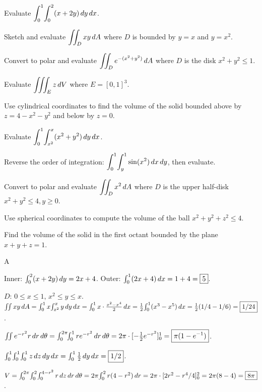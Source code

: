 \documentclass[11pt]{article}
\begin{document}
\begin{problems}
\item Evaluate $\displaystyle \int_0^1 \!\int_0^2 (x + 2y) \,dy \,dx$.
\item Sketch and evaluate $\displaystyle \iint_D x y \,dA$ where $D$ is bounded by $y = x$ and $y = x^2$.
\item Convert to polar and evaluate $\displaystyle \iint_D e^{-(x^2+y^2)} \,dA$ where $D$ is the disk $x^2 + y^2 \le 1$.
\item Evaluate $\displaystyle \iiint_E z \,dV$ where $E = [0,1]^3$.
\item Use cylindrical coordinates to find the volume of the solid bounded above by $z = 4 - x^2 - y^2$ and below by $z = 0$.
\end{problems}

\vfill
\newpage
{}
\begin{problems}
\item Evaluate $\displaystyle \int_0^1 \!\int_{x^2}^{x} (x^2 + y^2) \,dy \,dx$.
\item Reverse the order of integration: $\displaystyle \int_0^1 \!\int_y^1 \sin(x^2) \,dx \,dy$, then evaluate.
\item Convert to polar and evaluate $\displaystyle \iint_D x^2 \,dA$ where $D$ is the upper half-disk $x^2 + y^2 \le 4, y \ge 0$.
\item Use spherical coordinates to compute the volume of the ball $x^2 + y^2 + z^2 \le 4$.
\item Find the volume of the solid in the first octant bounded by the plane $x + y + z = 1$.
\end{problems}

\vfill
\newpage
{}

\begin{answers}{A}
\item Inner: $\int_0^2 (x + 2y) \,dy = 2x + 4$. Outer: $\int_0^1 (2x + 4) \,dx = 1 + 4 = \boxed{5}$.
\item $D$: $0 \le x \le 1$, $x^2 \le y \le x$. $\iint xy \,dA = \int_0^1 x \!\int_{x^2}^x y \,dy \,dx = \int_0^1 x \cdot \tfrac{x^2 - x^4}{2} \,dx = \tfrac{1}{2}\!\int_0^1 (x^3 - x^5) \,dx = \tfrac{1}{2}(1/4 - 1/6) = \boxed{1/24}$.
\item $\iint e^{-r^2} r \,dr \,d\theta = \int_0^{2\pi}\!\!\int_0^1 r e^{-r^2} \,dr \,d\theta = 2\pi \cdot [-\tfrac{1}{2} e^{-r^2}]_0^1 = \boxed{\pi(1 - e^{-1})}$.
\item $\int_0^1\!\int_0^1\!\int_0^1 z \,dz \,dy \,dx = \int_0^1 \tfrac{1}{2} \,dy \,dx = \boxed{1/2}$.
\item $V = \int_0^{2\pi}\!\int_0^2\!\int_0^{4-r^2} r \,dz \,dr \,d\theta = 2\pi \!\int_0^2 r(4 - r^2) \,dr = 2\pi \cdot [2r^2 - r^4/4]_0^2 = 2\pi(8 - 4) = \boxed{8\pi}$.
\end{answers}
\end{document}
